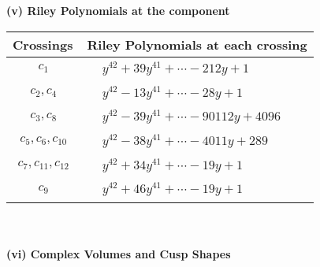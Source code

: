 \documentclass[1p]{elsarticle_modified}
\theoremstyle{definition}
\begin{document}
\newpage\renewcommand{\arraystretch}{1}
\flushleft \textbf{(v) Riley Polynomials at the component}\newline \\
\begin{tabular}{m{50pt}|m{274pt}}
Crossings & \hspace{64pt}Riley Polynomials at each crossing \\
\hline $$\begin{aligned}c_{1}\end{aligned}$$&$\begin{aligned}
&y^{42}+39 y^{41}+\cdots-212 y+1
\end{aligned}$\\
\hline $$\begin{aligned}c_{2},c_{4}\end{aligned}$$&$\begin{aligned}
&y^{42}-13 y^{41}+\cdots-28 y+1
\end{aligned}$\\
\hline $$\begin{aligned}c_{3},c_{8}\end{aligned}$$&$\begin{aligned}
&y^{42}-39 y^{41}+\cdots-90112 y+4096
\end{aligned}$\\
\hline $$\begin{aligned}c_{5},c_{6},c_{10}\end{aligned}$$&$\begin{aligned}
&y^{42}-38 y^{41}+\cdots-4011 y+289
\end{aligned}$\\
\hline $$\begin{aligned}c_{7},c_{11},c_{12}\end{aligned}$$&$\begin{aligned}
&y^{42}+34 y^{41}+\cdots-19 y+1
\end{aligned}$\\
\hline $$\begin{aligned}c_{9}\end{aligned}$$&$\begin{aligned}
&y^{42}+46 y^{41}+\cdots-19 y+1
\end{aligned}$\\
\hline
\end{tabular}\\~\\
\newpage\flushleft \textbf{(vi) Complex Volumes and Cusp Shapes}
\end{document}

